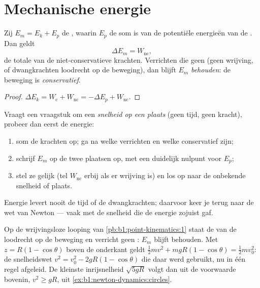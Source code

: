 \section{Mechanische energie}

\begin{theorem}\label{thm:b1:work-and-energy:em}
Zij $E_m = E_k + E_p$ de \emph{}, waarin $E_p$ de
som is van de potentiële energieën van de . Dan geldt
\[
\Delta E_m = W_{\text{nc}} ,
\]
de totale  van de niet-conservatieve krachten. Verrichten die geen 
(geen wrijving, of dwangkrachten loodrecht op de beweging), dan blijft $E_m$
\emph{behouden}: de beweging is \emph{conservatief}.
\end{theorem}

\begin{proof}
$\Delta E_k = W_{\text{c}} + W_{\text{nc}} = -\Delta E_p + W_{\text{nc}}$.
\end{proof}

\begin{method}\label{met:b1:work-and-energy:method}
Vraagt een vraagstuk om een \emph{snelheid op een plaats} (geen tijd, geen
kracht), probeer dan eerst de energie:
\begin{enumerate}
  \item som de krachten op; ga na welke  verrichten en welke conservatief zijn;
  \item schrijf $E_m$ op de twee plaatsen op, met een duidelijk nulpunt voor $E_p$;
  \item stel ze gelijk (tel $W_{\text{nc}}$ erbij als er wrijving is) en los
        op naar de onbekende snelheid of plaats.
\end{enumerate}
Energie levert nooit de tijd of de dwangkrachten; daarvoor keer je terug
naar de wet van Newton --- vaak met de snelheid die de energie zojuist gaf.
\end{method}

\begin{example}\label{ex:b1:work-and-energy:loop}
Op de wrijvingsloze looping van \cref{pb:b1:point-kinematics:1} staat de
 van de  loodrecht op de beweging en verricht geen : $E_m$ blijft behouden.
Met $z = R(1 - \cos\theta)$ boven de onderkant geldt $\tfrac12 mv^2 + mgR(1 -
\cos\theta) = \tfrac12 mv_0^2$: de snelheidswet $v^2 = v_0^2 - 2gR(1 -
\cos\theta)$ die daar werd gebruikt, nu in één regel afgeleid. De kleinste
inrijsnelheid $\sqrt{5gR}$ volgt dan uit de voorwaarde bovenin,
$v^2 \geq gR$, uit \cref{ex:b1:newton-dynamics:circles}.
\end{example}

